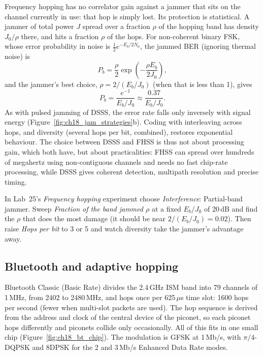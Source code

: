 Frequency hopping has no correlator gain against a jammer that sits on the channel currently
in use: that hop is simply lost. Its protection is statistical. A jammer of total power $J$
spread over a fraction $\rho$ of the hopping band has density $J_0/\rho$ there, and hits a
fraction $\rho$ of the hops. For non-coherent binary FSK, whose error probability in noise
is $\tfrac12e^{-E_b/2N_0}$, the jammed BER (ignoring thermal noise) is
\begin{equation}
P_b=\frac{\rho}{2}\exp\!\left(-\frac{\rho E_b}{2J_0}\right),
\end{equation}
and the jammer's best choice, $\rho=2/(E_b/J_0)$ (when that is less than 1), gives
\begin{equation}
P_b=\frac{e^{-1}}{E_b/J_0}\approx\frac{0.37}{E_b/J_0}.
\end{equation}
As with pulsed jamming of DSSS, the error rate falls only inversely with signal energy
(Figure~\ref{fig:ch18_jam_strategies}b).
Coding with interleaving across hops, and diversity (several hops per bit, combined),
restores exponential behaviour. The choice between DSSS and FHSS is thus not about
processing gain, which both have, but about practicalities: FHSS can spread over hundreds
of megahertz using non-contiguous channels and needs no fast chip-rate processing, while
DSSS gives coherent detection, multipath resolution and precise timing.

\begin{tryit}
In Lab~25's \emph{Frequency hopping} experiment choose \emph{Interference}: Partial-band jammer.
Sweep \emph{Fraction of the band jammed $\rho$} at a fixed $E_b/J_0$ of 20\,dB and find the
$\rho$ that does the most damage (it should be near $2/(E_b/J_0)=0.02$). Then raise
\emph{Hops per bit} to 3 or 5 and watch diversity take the jammer's advantage away.
\end{tryit}

\subsection{Bluetooth and adaptive hopping}

Bluetooth Classic (Basic Rate) divides the 2.4\,GHz ISM band into 79 channels of 1\,MHz,
from 2402 to 2480\,MHz, and hops once per 625\,$\mu$s time slot: 1600 hops per second (fewer
when multi-slot packets are used). The hop sequence is derived from the address and clock of
the central device of the piconet, so each piconet hops differently and piconets collide
only occasionally. All of this fits in one small chip (Figure~\ref{fig:ch18_bt_chip}). The modulation is GFSK at
1\,Mb/s, with $\pi/4$-DQPSK and 8DPSK for the
2 and 3\,Mb/s Enhanced Data Rate modes.

